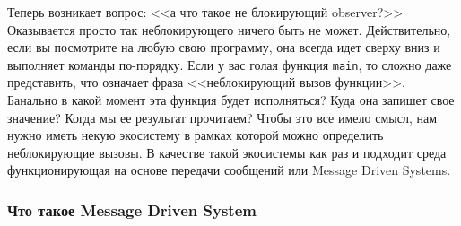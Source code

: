 Теперь возникает вопрос: <<а что такое не блокирующий observer?>>
Оказывается просто так неблокирующего ничего быть не может.
Действительно, если вы посмотрите на любую свою программу, она всегда идет сверху вниз и выполняет команды по-порядку.
Если у вас голая функция \verb"main", то сложно даже представить, что означает фраза <<неблокирующий вызов функции>>.
Банально в какой момент эта функция будет исполняться?
Куда она запишет свое значение?
Когда мы ее результат прочитаем?
Чтобы это все имело смысл, нам нужно иметь некую экосистему в рамках которой можно определить неблокирующие вызовы.
В качестве такой экосистемы как раз и подходит среда функционирующая на основе передачи сообщений или Message Driven Systems.

\subsubsection{Что такое Message Driven System}


